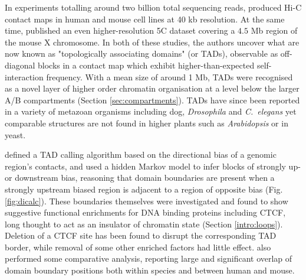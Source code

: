 \documentclass[a4paper,11pt,oneside]{book}
\begin{document}
In experiments totalling around two billion total sequencing reads, \citet{Dixon2012} produced Hi-C contact maps in human and mouse cell lines at 40 kb resolution. At the same time, \citet{Nora2012} published an even higher-resolution 5C dataset covering a $4.5$ Mb region of the mouse X chromosome. In both of these studies, the authors uncover what are now known as "topologically associating domains" (or TADs), observable as off-diagonal blocks in a contact map which exhibit higher-than-expected self-interaction frequency. With a mean size of around 1 Mb, TADs were recognised as a novel layer of higher order chromatin organisation at a level below the larger A/B compartments (Section \ref{sec:compartments}). TADs have since been reported in a variety of metazoan organisms including dog,\cite{VietriRudan2015} \emph{Drosophila}\cite{Sexton2012, Hou2012} and \emph{C.~elegans}\cite{Crane2015} yet comparable structures are not found in higher plants such as \emph{Arabidopsis}\cite{Feng2014, Wang2015} or in yeast.\cite{Duan2010, Gong2015}

\citet{Dixon2012} defined a TAD calling algorithm based on the directional bias of a genomic region's contacts, and used a hidden Markov model to infer blocks of strongly up- or downstream bias, reasoning that domain boundaries are present when a strongly upstream biased region is adjacent to a region of opposite bias (Fig. \ref{fig:dicalc}). These boundaries themselves were investigated and found to show suggestive functional enrichments for DNA binding proteins including CTCF, long thought to act as an insulator of chromatin state (Section \ref{intro:loops}). Deletion of a  CTCF site has been found to disrupt the corresponding TAD border, while removal of some other enriched factors had little effect.\cite{Nora2012, Zuin2013, Narendra2015}
\citet{Dixon2012} also performed some comparative analysis, reporting large and significant overlap of domain boundary positions both within species and between human and mouse.
\end{document}
